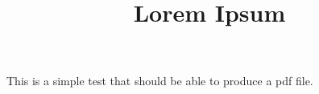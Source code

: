 \documentclass[a4paper,11pt,oneside]{book}
\title{\Huge \textbf{Lorem Ipsum}}
\author{\textsc{}}
\begin{document}
\sloppy

\frontmatter
\maketitle

\tableofcontents

\mainmatter

% 
% 

This is a simple test that should be able to produce a pdf file.
\end{document}
